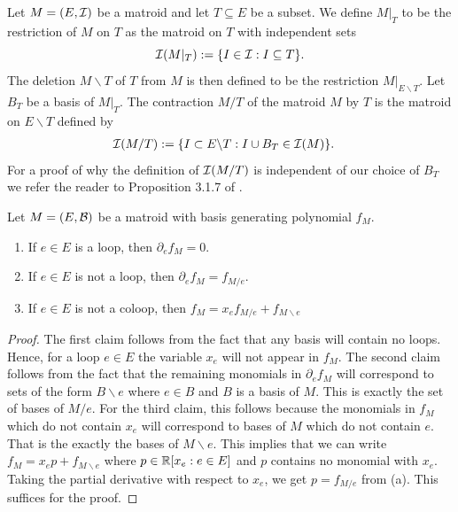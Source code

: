 \documentclass{puthesis-UG}
\begin{document}
\begin{defn}\label{contraction-deletion}
	Let $M = (E, \mathcal{I})$ be a matroid and let $T \subseteq E$ be a subset. We define $M|_T$ to be the restriction of $M$ on $T$ as the matroid on $T$ with independent sets 
	\[
		\mathcal{I} (M|_T) := \{I \in \mathcal{I} : I \subseteq T\}.
	\]
	The deletion $M \backslash T$ of $T$ from $M$ is then defined to be the restriction $M|_{E \backslash T}$. Let $B_T$ be a basis of $M|_T$. The contraction $M / T$ of the matroid $M$ by $T$ is the matroid on $E \backslash T$ defined by
	\begin{align*}
		\mathcal{I}(M/T) & := \{I \subset E \backslash T: I \cup B_T \in \mathcal{I}(M) \}.
	\end{align*}
	For a proof of why the definition of $\mathcal{I}(M/T)$ is independent of our choice of $B_T$ we refer the reader to Proposition 3.1.7 of \cite{10.5555/1197093}.
\end{defn}

\begin{lem}
	Let $M = (E, \mathcal{B})$ be a matroid with basis generating polynomial $f_M$.
	\begin{enumerate}[label = (\alph*)]
		\item If $e \in E$ is a loop, then $\partial_e f_M = 0$. 
		\item If $e \in E$ is not a loop, then $\partial_e f_M = f_{M/e}$. 
		\item If $e \in E$ is not a coloop, then $f_M = x_e f_{M/e} + f_{M \backslash e}$
	\end{enumerate}
\end{lem}

\begin{proof}
	The first claim follows from the fact that any basis will contain no loops. Hence, for a loop $e \in E$ the variable $x_e$ will not appear in $f_M$. The second claim follows from the fact that the remaining monomials in $\partial_e f_M$ will correspond to sets of the form $B \backslash e$ where $e \in B$ and $B$ is a basis of $M$. This is exactly the set of bases of $M / e$. For the third claim, this follows	because the monomials in $f_M$ which do not contain $x_e$ will correspond to bases of $M$ which do not contain $e$. That is the exactly the bases of $M \backslash e$. This implies that we can write $f_M = x_e p + f_{M \backslash e}$ where $p \in \mathbb{R}[x_e : e \in E]$ and $p$ contains no monomial with $x_e$. Taking the partial derivative with respect to $x_e$, we get $p = f_{M / e}$ from (a). This suffices for the proof. 
\end{proof}
\end{document}
